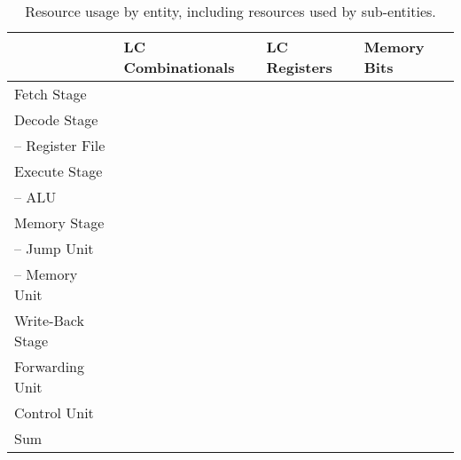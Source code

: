 \begin{table}[htb]
  \centering
  \caption{Resource usage by entity, including resources used by sub-entities.}
  \begin{tabular}{llll}
    \toprule
                         & LC Combinationals & LC Registers & Memory Bits \\
    \midrule
    Fetch Stage          &                   &              &             \\
    Decode Stage         &                   &              &             \\
    -- Register File     &                   &              &             \\
    Execute Stage        &                   &              &             \\
    -- ALU               &                   &              &             \\
    Memory Stage         &                   &              &             \\
    -- Jump Unit         &                   &              &             \\
    -- Memory Unit       &                   &              &             \\
    Write-Back Stage     &                   &              &             \\
    Forwarding Unit      &                   &              &             \\
    Control Unit         &                   &              &             \\
    \cmidrule{1-4}
    Sum                  &                   &              &             \\
    \bottomrule
  \end{tabular}
\end{table}

\begin{qa}
  \answer{}
\end{qa}
